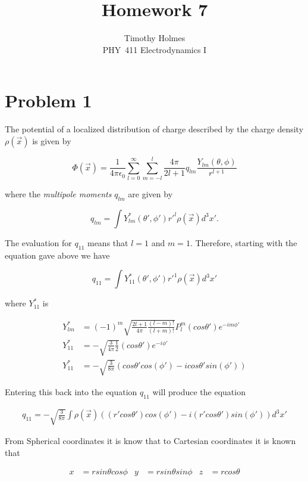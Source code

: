 \documentclass[11pt]{article}
\newcommand{\HWnum}{7}
\newcommand{\Subject}{PHY}
\begin{document}

\title{Homework {\HWnum}}
\author{Timothy Holmes \\ \Subject~411 Electrodynamics I}

\maketitle

\section*{Problem 1}

The potential of a localized distribution of charge described by the charge density $\rho(\vec{x})$ is given by 

$$
\Phi(\vec{x}) = \frac{1}{4\pi\epsilon_{0}} \sum_{l=0}^{\infty} \sum_{m=-l}^{l} \frac{4\pi}{2l+1}q_{lm}\frac{Y_{lm}(\theta, \phi)}{r^{l+1}}
$$

where the \textit{multipole moments} $q_{lm}$ are given by

$$
q_{lm} = \int Y^{*}_{lm}(\theta', \phi')r'^{l} \rho(\vec{x}) d^{3}x'.
$$

The evaluation for $q_{11}$ means that $l = 1$ and $m = 1$. Therefore, starting with the equation gave above we have

$$
q_{11} = \int Y^{*}_{11}(\theta', \phi') r'^{1} \rho(\vec{x}) d^{3}x'
$$

where $Y^{*}_{11}$ is 

\begin{align*}
Y^{*}_{lm} &= (-1)^{m} \sqrt{\frac{2l+1}{4\pi}\frac{(l-m)!}{(l+m)!}} P_{l}^{m}(cos\theta')e^{-im\phi'} \\
Y^{*}_{11} &= -\sqrt{\frac{3}{4\pi}\frac{1}{2}} (cos\theta')e^{-i\phi'} \\ 
Y^{*}_{11}&= -\sqrt{\frac{3}{8\pi}} (cos\theta'cos(\phi') - icos\theta'sin(\phi'))
\end{align*}

Entering this back into the equation $q_{11}$ will produce the equation

\begin{align*}
q_{11} = -\sqrt{\frac{3}{8\pi}} \int \rho(\vec{x})((r'cos\theta')cos(\phi') - i(r'cos\theta')sin(\phi')) d^{3}x'
\end{align*}

From Spherical coordinates it is know that to Cartesian coordinates it is known that 

\begin{align*}
x &= rsin\theta cos\phi & y &= rsin\theta sin\phi & z &= rcos\theta
\end{align*}
\end{document}
